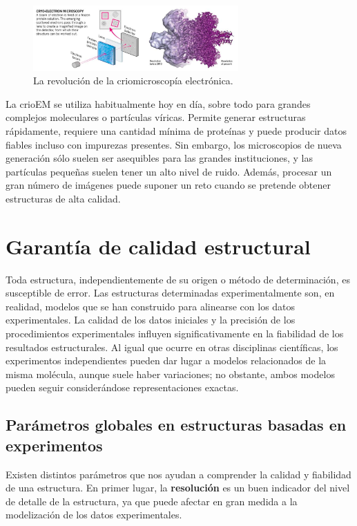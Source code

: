 \begin{figure}[h]
\centering
\includegraphics[width = 0.7\textwidth]{figs/paste-E5E5AE75.png}
\caption{La revolución de la criomicroscopía electrónica.}
\label{fig:cryo-rev}
\end{figure}

La crioEM se utiliza habitualmente hoy en día, sobre todo para grandes complejos moleculares o partículas víricas. Permite generar estructuras rápidamente, requiere una cantidad mínima de proteínas y puede producir datos fiables incluso con impurezas presentes. Sin embargo, los microscopios de nueva generación sólo suelen ser asequibles para las grandes instituciones, y las partículas pequeñas suelen tener un alto nivel de ruido. Además, procesar un gran número de imágenes puede suponer un reto cuando se pretende obtener estructuras de alta calidad.

\section{Garantía de calidad estructural}
Toda estructura, independientemente de su origen o método de determinación, es susceptible de error. Las estructuras determinadas experimentalmente son, en realidad, modelos que se han construido para alinearse con los datos experimentales. La calidad de los datos iniciales y la precisión de los procedimientos experimentales influyen significativamente en la fiabilidad de los resultados estructurales. Al igual que ocurre en otras disciplinas científicas, los experimentos independientes pueden dar lugar a modelos relacionados de la misma molécula, aunque suele haber variaciones; no obstante, ambos modelos pueden seguir considerándose representaciones exactas.

\subsection{Parámetros globales en estructuras basadas en experimentos}
Existen distintos parámetros que nos ayudan a comprender la calidad y fiabilidad de una estructura. En primer lugar, la \textbf{resolución} es un buen indicador del nivel de detalle de la estructura, ya que puede afectar en gran medida a la modelización de los datos experimentales.

